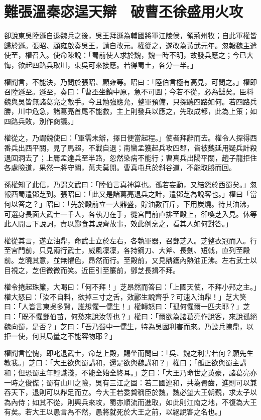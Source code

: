 
\chapter{難張溫秦宓逞天辯　破曹丕徐盛用火攻}

卻說東吳陸遜自退魏兵之後，吳王拜遜為輔國將軍江陵侯，領荊州牧；自此軍權皆歸於遜。張昭、顧雍啟奏吳王，請自改元。權從之，遂改為黃武元年。忽報魏主遣使至，權召入。使命陳說：「蜀前使人求於魏，魏一時不明，故發兵應之；今已大悔，欲起四路兵取川，東吳可來接應。若得蜀土，各分一半。」

權聞言，不能決，乃問於張昭、顧雍等。昭曰：「陸伯言極有高見，可問之。」權即召陸遜至。遜至，奏曰：「曹丕坐鎮中原，急不可圖；今若不從，必為讎矣。臣料魏與吳皆無諸葛亮之敵手。今且勉強應允，整軍預備，只探聽四路如何。若四路兵勝，川中危急，諸葛亮首尾不能救，主上則發兵以應之，先取成都，此為上策；如四路兵敗，別作商議。」

權從之，乃謂魏使曰：「軍需未辦，擇日便當起程。」使者拜辭而去。權令人探得西番兵出西平關，見了馬超，不戰自退；南蠻孟獲起兵攻四郡，皆被魏延用疑兵計殺退回洞去了；上庸孟達兵至半路，忽然染病不能行；曹真兵出陽平關，趙子龍拒住各處險道，果然一將守關，萬夫莫開。曹真屯兵於斜谷道，不能取勝而回。

孫權知了此信，乃謂文武曰：「陸伯言真神算也。孤若妄動，又結怨於西蜀矣。」忽報西蜀遣鄧芝到。張昭曰：「此又是諸葛亮退兵之計，遣鄧芝為說客也。」權曰「當何以答之？」昭曰：「先於殿前立一大鼎盛，貯油數百斤，下用炭燒。待其油沸，可選身長面大武士一千人，各執刀在手，從宮門前直排至殿上，卻喚芝入見。休等此人開言下說詞，責以酈食其說齊故事，效此例烹之，看其人如何對答。」

權從其言，遂立油鼎，命武士立於左右，各執軍器，召鄧芝入。芝整衣冠而入。行至宮門前，只見兩行武士，威風凜凜，各持鋼刀、大斧、長劍、短戟，直列至殿前。芝曉其意，並無懼色，昂然而行。至殿前，又見鼎鑊內熱油正沸。左右武士以目視之，芝但微微而笑。近臣引至簾前，鄧芝長揖不拜。

權令捲起珠簾，大喝曰：「何不拜！」芝昂然而答曰：「上國天使，不拜小邦之主。」權大怒曰：「汝不自料，欲掉三寸之舌，效酈生說齊乎？可速入油鼎！」芝大笑曰：「人皆言東吳多賢，誰想懼一儒生！」權轉怒曰：「孤何懼爾一匹夫耶？」芝曰：「既不懼鄧伯苗，何愁來說汝等也？」權曰：「爾欲為諸葛亮作說客，來說孤絕魏向蜀，是否？」芝曰：「吾乃蜀中一儒生，特為吳國利害而來。乃設兵陳鼎，以拒一使，何其局量之不能容物耶？」

權聞言惶愧，即叱退武士，命芝上殿，賜坐而問曰：「吳、魏之利害若何？願先生教我。」芝曰：「大王欲與蜀講和，還是欲與魏講和？」權曰；「孤正欲與蜀主講和；但恐蜀主年輕識淺，不能全始全終耳。」芝曰：「大王乃命世之英豪，諸葛亮亦一時之俊傑；蜀有山川之險，吳有三江之固：若二國連和，共為脣齒，進則可以兼吞天下，退則可以鼎足而立。今大王若委贄稱臣於魏，魏必望大王朝覲，求太子以為內侍；如其不從，則興兵來攻，蜀亦順流而進取，如此則江南之地，不復為大王有矣。若大王以愚言為不然，愚將就死於大王之前，以絕說客之名也。」

